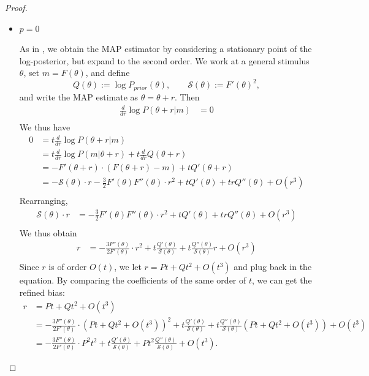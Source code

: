 \begin{proof}
\begin{itemize}
    
    \item $p = 0$

As in \cite{Stocker2006NoiseCA,hahn2024unifying}, we obtain the MAP estimator by considering a stationary point of the log-posterior, but expand to the second order.
We work at a general stimulus \(\theta\), set \(m=F(\theta)\), and define
\[
Q(\theta):=\log P_{prior}(\theta), \qquad \mathcal{S}(\theta):=F'(\theta)^2,
\]
and write the MAP estimate as \(\widehat{\theta}=\theta+r\). Then
    \begin{align*}
    \frac{d}{d r} \log P(\theta+r|m) &= 0\\
\end{align*}
We thus have
\begin{align*}
    0 &= t \frac{d}{d r} \log P(\theta+r|m)\\
    &= t \frac{d}{d r} \log P(m|\theta+r) + t \frac{d}{d r} Q(\theta+r)\\
    &= -F'(\theta+r) \cdot (F(\theta+r) - m) + t Q'(\theta+r)\\
    &= -\mathcal{S}(\theta) \cdot r - \frac{3}{2}F'(\theta)F''(\theta) \cdot r^2 + t Q'(\theta) + trQ''(\theta) + O(r^3)\\
\end{align*}
Rearranging,
\begin{align*}
    \mathcal{S}(\theta) \cdot r &= - \frac{3}{2}F'(\theta)F''(\theta) \cdot r^2 + t Q'(\theta) + trQ''(\theta) + O(r^3)\\
    \end{align*}
    We thus obtain
    \begin{align*}
    r &= - \frac{3F''(\theta)}{2F'(\theta)} \cdot r^2 + t \frac{Q'(\theta)}{\mathcal{S}(\theta)} + t \frac{Q''(\theta)}{\mathcal{S}(\theta)} r + O(r^3)\\
\end{align*}
Since \(r\) is of order \(O(t)\), we let \(r = Pt + Qt^2 + O(t^3)\) and plug back in the equation. 
By comparing the coefficients of the same order of \(t\), we can get the refined bias:
\begin{align*}
    r &= Pt + Qt^2 + O(t^3)\\
    &= - \frac{3F''(\theta)}{2F'(\theta)} \cdot (Pt + Qt^2 + O(t^3))^2 + t \frac{Q'(\theta)}{\mathcal{S}(\theta)} + t \frac{Q''(\theta)}{\mathcal{S}(\theta)} (Pt + Qt^2 + O(t^3)) + O(t^3)\\
    &= - \frac{3F''(\theta)}{2F'(\theta)} \cdot P^2t^2 + t \frac{Q'(\theta)}{\mathcal{S}(\theta)} + Pt^2 \frac{Q''(\theta)}{\mathcal{S}(\theta)} + O(t^3).
    \end{align*}

\end{itemize}
\end{proof}
